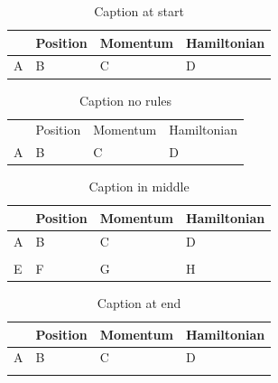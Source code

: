 \documentclass{article}
\begin{document}
\begin{longtable}{|p{1in}|p{1in}|p{1in}|p{1in}|}
\caption{Caption at start}\label{cap-start}\\\hline
& Position & Momentum & Hamiltonian\\\hline
A&B&C&D\\\hline
\end{longtable}

\begin{longtable}{p{1in}p{1in}p{1in}p{1in}}
\caption{Caption no rules}\label{cap-norules}\\
& Position & Momentum & Hamiltonian\\
A&B&C&D\\
\end{longtable}

\begin{longtable}{|p{1in}|p{1in}|p{1in}|p{1in}|}
\hline
& Position & Momentum & Hamiltonian\\\hline
A&B&C&D\\\hline
\caption{Caption in middle}\label{cap-middle}\\\hline
E&F&G&H\\\hline
\end{longtable}

\begin{longtable}{|p{1in}|p{1in}|p{1in}|p{1in}|}
\hline
& Position & Momentum & Hamiltonian\\\hline
A&B&C&D\\\hline
\caption{Caption at end}\label{cap-end}\\
\end{longtable}
\end{document}

